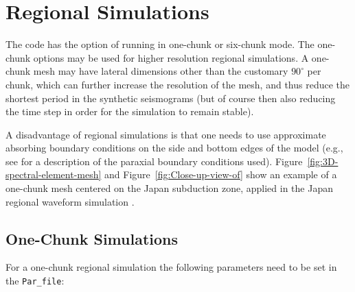 \chapter{Regional Simulations}\label{cha:Regional-Simulations}


The code has the option of running in one-chunk or six-chunk mode.
The one-chunk options may be used for higher resolution regional
simulations. A one-chunk mesh may have lateral dimensions other than
the customary $90^{\circ}$ per chunk, which can further increase
the resolution of the mesh, and thus reduce the shortest period in
the synthetic seismograms (but of course then also reducing the time
step in order for the simulation to remain stable).\newline


A disadvantage of regional simulations is that one needs to use approximate absorbing
boundary conditions on the side and bottom edges of the model (e.g.,
see \citet{KoTr99} for a description of the paraxial boundary conditions
used). Figure~\vref{fig:3D-spectral-element-mesh} and Figure~\vref{fig:Close-up-view-of}
show an example of a one-chunk mesh centered on the Japan subduction
zone, applied in the Japan regional waveform simulation \citep{ChTrHeKa07}.\newline


\section{One-Chunk Simulations}\label{sec:One-Chunk-Simulations}

For a one-chunk regional simulation the following parameters need
to be set in the \texttt{Par\_file}:

